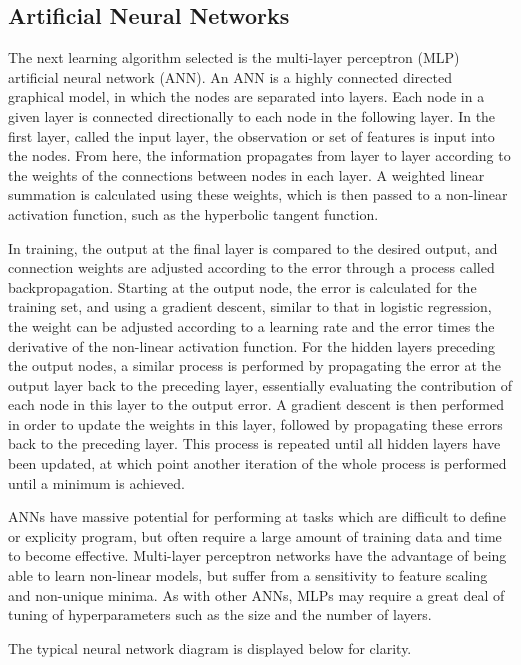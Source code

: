 \subsection{Artificial  Neural Networks}

The next learning algorithm selected is the multi-layer perceptron (MLP) artificial neural network (ANN).
An ANN is a highly connected directed graphical model, in which the nodes are separated into layers.
Each node in a given layer is connected directionally to each node in the following layer.
In the first layer, called the input layer, the observation or set of features is input into the nodes.
From here, the information propagates from layer to layer according to the weights of the connections between nodes in each layer.
A weighted linear summation is calculated using these weights, which is then passed to a non-linear activation function, such as the hyperbolic tangent function.


In training, the output at the final layer is compared to the desired output, and connection weights are adjusted according to the error through a process called backpropagation.
Starting at the output node, the error is calculated for the training set, and using a gradient descent, similar to that in logistic regression, the weight can be adjusted according to a learning rate and the error times the derivative of the non-linear activation function.
For the hidden layers preceding the output nodes, a similar process is performed by propagating the error at the output layer back to the preceding layer, essentially evaluating the contribution of each node in this layer to the output error.
A gradient descent is then performed in order to update the weights in this layer, followed by propagating these errors back to the preceding layer.
This process is repeated until all hidden layers have been updated, at which point another iteration of the whole process is performed until a minimum is achieved.


ANNs have massive potential for performing at tasks which are difficult to define or explicity program, but often require a large amount of training data and time to become effective.
Multi-layer perceptron networks have the advantage of being able to learn non-linear models, but suffer from a sensitivity to feature scaling and non-unique minima.
As with other ANNs, MLPs may require a great deal of tuning of hyperparameters such as the size and the number of layers.

The typical neural network diagram is displayed below for clarity.

